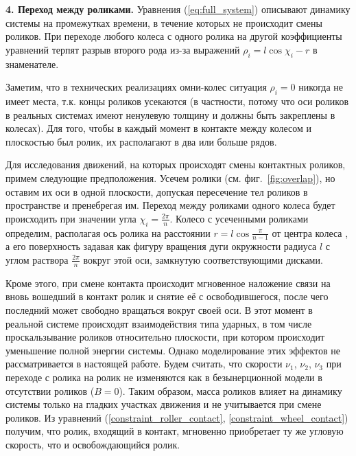 {\bf 4. Переход между роликами.}
Уравнения (\ref{eq:full_system}) описывают динамику системы на промежутках времени, в течение которых не происходит смены роликов. 
При переходе любого колеса с одного ролика на другой коэффициенты уравнений терпят разрыв второго рода из-за выражений $\rho_i = l\cos\chi_i-r$ в знаменателе.


Заметим, что в технических реализациях омни-колес ситуация $\rho_i = 0$ никогда не имеет места, т.к. концы роликов усекаются (в частности, потому что оси роликов в реальных системах имеют ненулевую толщину и должны быть закреплены в колесах). Для того, чтобы в каждый момент в контакте между колесом и плоскостью был ролик, их располагают в два или больше рядов. %

Для исследования движений, на которых происходят смены контактных роликов, примем следующие предположения. Усечем ролики (см. фиг.~\ref{fig:overlap}), но оставим их оси в одной плоскости, допуская пересечение тел роликов в пространстве и пренебрегая им. Переход между роликами одного колеса будет происходить при значении угла $\chi_i = \frac{2\pi}{n}$. Колесо с усеченными роликами определим, располагая ось ролика на расстоянии $r = l\cos\frac{\pi}{n-1}$ от центра колеса
, а его поверхность задавая как фигуру вращения дуги окружности радиуса $l$ с углом раствора $\frac{2\pi}{n}$ вокруг этой оси, замкнутую соответствующими дисками.

Кроме этого, при смене контакта происходит мгновенное наложение связи на вновь вошедший в контакт ролик и снятие её с освободившегося, после чего последний может свободно вращаться вокруг своей оси. В этот момент в реальной системе происходят взаимодействия типа ударных, в том числе проскальзывание роликов относительно плоскости, при котором происходит уменьшение полной энергии системы. Однако моделирование этих эффектов не рассматривается в настоящей работе. Будем считать, что скорости $\nu_1$, $\nu_2$, $\nu_3$ при переходе с ролика на ролик не изменяются как в 
безынерционной модели в отсутствии роликов ($B = 0$).  Таким образом, масса роликов влияет на динамику системы только на гладких участках движения и не учитывается при смене роликов. Из уравнений (\ref{constraint_roller_contact}, \ref{constraint_wheel_contact}) получим, что ролик, входящий в контакт, мгновенно приобретает ту же угловую скорость, что и освобождающийся ролик.


